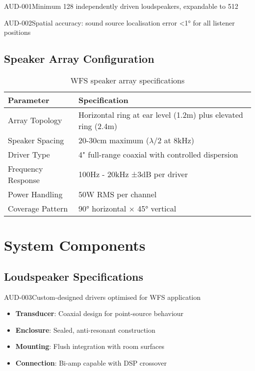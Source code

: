 \begin{requirement}{AUD-001}{Minimum 128 independently driven loudspeakers, expandable to 512}

\begin{requirement}{AUD-002}{Spatial accuracy: sound source localisation error <1° for all listener positions}

\subsection{Speaker Array Configuration}

\begin{table}[H]
\centering
\begin{tabularx}{\textwidth}{@{}lX@{}}
\toprule
\textbf{Parameter} & \textbf{Specification} \\
\midrule
Array Topology & Horizontal ring at ear level (1.2m) plus elevated ring (2.4m) \\
Speaker Spacing & 20-30cm maximum ($\lambda$/2 at 8kHz) \\
Driver Type & 4" full-range coaxial with controlled dispersion \\
Frequency Response & 100Hz - 20kHz ±3dB per driver \\
Power Handling & 50W RMS per channel \\
Coverage Pattern & 90° horizontal × 45° vertical \\
\bottomrule
\end{tabularx}
\caption{WFS speaker array specifications}
\end{table}

\section{System Components}

\subsection{Loudspeaker Specifications}

\begin{requirement}{AUD-003}{Custom-designed drivers optimised for WFS application}

\begin{itemize}
    \item \textbf{Transducer}: Coaxial design for point-source behaviour
    \item \textbf{Enclosure}: Sealed, anti-resonant construction
    \item \textbf{Mounting}: Flush integration with room surfaces
    \item \textbf{Connection}: Bi-amp capable with DSP crossover
\end{itemize}


\end{requirement}
\end{requirement}
\end{requirement}
